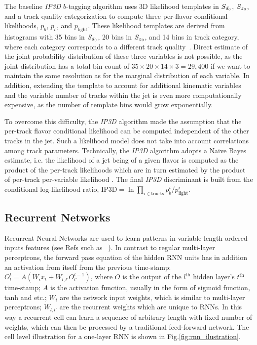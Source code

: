 The baseline \textit{IP3D} $b$-tagging algorithm uses 3D likelihood templates in $S_{d{_0}}$, $S_{z{_0}}$, and a track quality categorization to compute three per-flavor conditional likelihoods, $p_b$, $p_c$, and $p_{\textrm{light}}$. These likelihood templates are derived from histograms with 35 bins in $S_{d{_0}}$, 20 bins in $S_{z{_0}}$, and 14 bins in track category, where each category corresponds to a different track quality~\cite{ATL-PHYS-PUB-2015-022}. Direct estimate of the joint probability distribution of these three variables is not possible, as the joint distribution has a total bin count of $35 \times 20 \times 14 \times 3 = 29,400$ if we want to maintain the same resolution as for the marginal distribution of each variable. In addition, extending the template to account for additional kinematic variables and the variable number of tracks within the jet is even more computationally expensive, as the number of template bins would grow exponentially.

To overcome this difficulty, the \textit{IP3D} algorithm made the assumption that the per-track flavor conditional likelihood can be computed independent of the other tracks in the jet.  Such a likelihood model does not take into account correlations among track parameters. Technically, the \textit{IP3D} algorithm adopts a Naive Bayes estimate, i.e. the likelihood of a jet being of a given flavor is computed as the product of the per-track likelihoods which are in turn estimated by the product of per-track per-variable likelihood . The final \textit{IP3D} discriminant is built from the conditional log-likelihood ratio, $\textrm{IP3D}=\ln \prod_{i \in \textrm{tracks}} p_b^i / p_{\textrm{light}}^i$. 

\subsection{Recurrent Networks}

Recurrent Neural Networks are used to learn patterns in variable-length ordered inputs features (see Refs such as ~\cite{ref:RNNthesis, dlbook}). In contrast to regular multi-layer perceptrons, the forward pass equation of the hidden RNN units has in addition an activation from itself from the previous time-stamp: $O^t_l = A( W_i x_t + W_{l,l'} O^{t-1}_{l'})$, where $O$ is the output of the $l^{\text{th}}$ hidden layer's $t^{\text{th}}$ time-stamp; $A$ is the activation function, usually in the form of sigmoid function, tanh and etc.; $W_i$ are the network input weights, which is similar to multi-layer perceptrons; $W_{l,l'}$ are the recurrent weights which are unique to RNNs. In this way a recurrent cell can learn a sequence of arbitrary length with fixed number of weights, which can then be processed by a traditional feed-forward network. The cell level illustration for a one-layer RNN is shown in Fig.\ref{fig:rnn_ilustration}.

